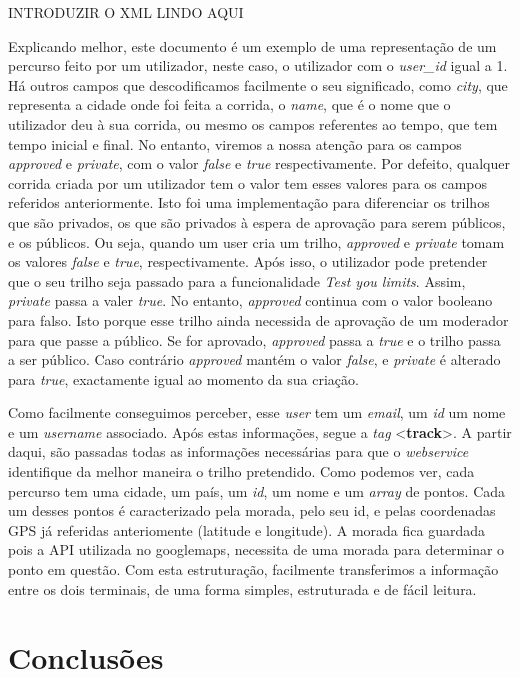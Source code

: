 \documentclass[twocolumn,twoside,10pt,a4paper]{article}
\begin{document}
INTRODUZIR O XML LINDO AQUI

Explicando melhor, este documento é um exemplo de uma representação de um percurso feito por um utilizador, neste caso, o utilizador com o \textit{user\_id} igual a 1. Há outros campos que descodificamos facilmente o seu significado, como \textit{city}, que representa a cidade onde foi feita a corrida, o \textit{name}, que é o nome que o utilizador deu à sua corrida, ou mesmo os campos referentes ao tempo, que tem tempo inicial e final. No entanto, viremos a nossa atenção para os campos \textit{approved} e \textit{private}, com o valor \textit{false} e \textit{true} respectivamente. Por defeito, qualquer corrida criada por um utilizador tem o valor tem esses valores para os campos referidos anteriormente. Isto foi uma implementação para diferenciar os trilhos que são privados, os que são privados à espera de aprovação para serem públicos, e os públicos. Ou seja, quando um user cria um trilho, \textit{approved} e \textit{private} tomam os valores \textit{false} e \textit{true}, respectivamente. Após isso, o utilizador pode pretender que o seu trilho seja passado para a funcionalidade \textit{Test you limits}. Assim, \textit{private} passa a valer \textit{true}. No entanto, \textit{approved} continua com o valor booleano para falso. Isto porque esse trilho ainda necessida de aprovação de um moderador para que passe a público. Se for aprovado, \textit{approved} passa a \textit{true} e o trilho passa a ser público. Caso contrário \textit{approved} mantém o valor \textit{false}, e \textit{private} é alterado para \textit{true}, exactamente igual ao momento da sua criação.

Como facilmente conseguimos perceber, esse \textit{user} tem um \textit{email}, um \textit{id} um nome e um \textit{username} associado. Após estas informações, segue a \textit{tag} <\textbf{track}>. A partir daqui, são passadas todas as informações necessárias para que o \textit{webservice} identifique da melhor maneira o trilho pretendido. Como podemos ver, cada percurso tem uma cidade, um país, um \textit{id}, um nome e um \textit{array} de pontos. Cada um desses pontos é caracterizado pela morada, pelo seu id, e pelas coordenadas GPS já referidas anteriomente (latitude e longitude). A morada fica guardada pois a API utilizada no googlemaps, necessita de uma morada para determinar o ponto em questão. Com esta estruturação, facilmente transferimos a informação entre os dois terminais, de uma forma simples, estruturada e de fácil leitura.


\section{Conclusões}\label{sec:conclusions}
\end{document}
